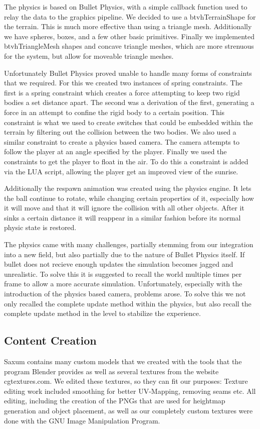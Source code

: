 \documentclass[sponsored]{acmsiggraph}
\begin{document}
The physics is based on Bullet Physics, with a simple callback function used to relay the data to the graphics pipeline. We decided to use  a btvhTerrainShape for the terrain. This is much more effective than using a triangle mesh. Additionally we have spheres, boxes, and a few other basic primitives. Finally we implemented btvhTriangleMesh shapes and concave triangle meshes, which are more strenuous for the system, but allow for moveable triangle meshes.

Unfortunately Bullet Physics proved unable to handle many forms of constraints that we required. For this we created two instances of spring constraints. The first is a spring constraint which creates a force attempting to keep two rigid bodies a set distance apart. The second was a derivation of the first, generating a force in an attempt to confine the rigid body to a certain position. This constraint is what we used to create switches that could be embedded within the terrain by filtering out the collision between the two bodies.
We also used a similar constraint to create a physics based camera. The camera attempts to follow the player at an angle specified by the player. Finally we used the constraints to get the player to float in the air. To do this a constraint is added via the LUA script, allowing the player get an improved view of the sunrise.

Additionally the respawn animation was created using the physics engine. It lets the ball continue to rotate, while changing certain properties of it, especially how it will move and that it will ignore the collision with all other objects. After it sinks a certain distance it will reappear in a similar fashion before its normal physic state is restored.

The physics came with many challenges, partially stemming from our integration into a new field, but also partially due to the nature of Bullet Physics itself. If bullet does not recieve enough updates the simulation becomes jagged and unrealistic. To solve this it is suggested to recall the world multiple times per frame to allow a more accurate simulation. Unfortunately, especially with the introduction of the physics based camera, problems arose. To solve this we not only recalled the complete update method within the physics, but also recall the complete update method in the level to stabilize the experience.

\subsection{Content Creation}
Saxum contains many custom models that we created with the tools that the program Blender provides as well as several textures from the website cgtextures.com. We edited these textures, so they can fit our purposes: Texture editing work included smoothing for better UV-Mapping, removing seams etc. All editing, including the creation of the PNGs that are used for heightmap generation and object placement, as well as our completely custom textures were done with the GNU Image Manipulation Program.
\end{document}
